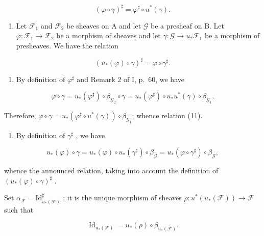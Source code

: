 \[
(\varphi \circ \gamma) ^ {\sharp} = \varphi^ {\sharp} \circ u ^ {*} (\gamma).\tag{11}
\]

\begin{enumerate}
\def\labelenumi{\alph{enumi})}
\setcounter{enumi}{1}
\tightlist
\item
  Let \(\mathcal{F}_1\) and \(\mathcal{F}_2\) be sheaves on A and let \(\mathcal{G}\) be a presheaf on B. Let \(\varphi\colon\mathcal{F}_1\to\mathcal{F}_2\) be a morphism of sheaves and let \(\gamma\colon\mathcal{G}\to u_*\mathcal{F}_1\) be a morphism of presheaves. We have the relation
\end{enumerate}

\[
(u _ {*} (\varphi) \circ \gamma) ^ {\sharp} = \varphi \circ \gamma^ {\sharp}.
\]

\begin{enumerate}
\def\labelenumi{\alph{enumi})}
\tightlist
\item
  By definition of \(\varphi^{\sharp}\) and Remark 2 of I, p.~60, we have
\end{enumerate}

\[
\varphi \circ \gamma = u _ {*} (\varphi^ {\sharp}) \circ \beta_ {\mathcal {G} _ {2}} \circ \gamma = u _ {*} (\varphi^ {\sharp}) \circ u _ {*} u ^ {*} (\gamma) \circ \beta_ {\mathcal {G} _ {1}}.
\]

Therefore, \(\varphi \circ \gamma = u_{*}(\varphi^{\sharp}\circ u^{*}(\gamma))\circ \beta_{\mathcal{G}_{1}}\); whence relation (11).

\begin{enumerate}
\def\labelenumi{\alph{enumi})}
\setcounter{enumi}{1}
\tightlist
\item
  By definition of \(\gamma^{\sharp}\) , we have
\end{enumerate}

\[
u _ {*} (\varphi) \circ \gamma = u _ {*} (\varphi) \circ u _ {*} (\gamma^ {\sharp}) \circ \beta_ {\mathcal {G}} = u _ {*} (\varphi \circ \gamma^ {\sharp}) \circ \beta_ {\mathcal {G}},
\]

whence the announced relation, taking into account the definition of \((u_{*}(\varphi)\circ\gamma)^{\sharp}\) .

Set \(\alpha_{\mathcal{F}} = \mathrm{Id}_{u_*(\mathcal{F})}^\sharp\) ; it is the unique morphism of sheaves \(\rho \colon u^*(u_*(\mathcal{F})) \to \mathcal{F}\) such that

\[
\operatorname{Id} _ {u _ {*} (\mathcal {F})} = u _ {*} (\rho) \circ \beta_ {u _ {*} (\mathcal {F})}.
\]


